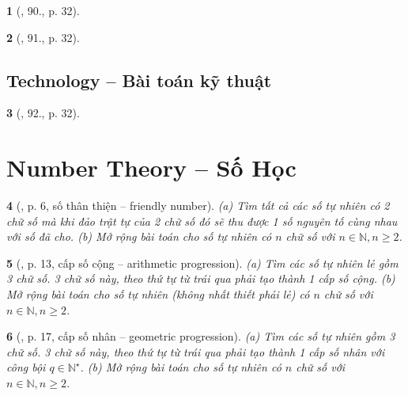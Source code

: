 \documentclass{article}
\newtheorem{baitoan}{}
\begin{document}
\begin{baitoan}[\cite{Doanh_Tuan_Pascal}, 90., p. 32]
	
\end{baitoan}

\begin{baitoan}[\cite{Doanh_Tuan_Pascal}, 91., p. 32]
	
\end{baitoan}


\subsection{Technology -- Bài toán kỹ thuật}

\begin{baitoan}[\cite{Doanh_Tuan_Pascal}, 92., p. 32]
	
\end{baitoan}


\section{Number Theory -- Số Học}

\begin{baitoan}[\cite{Huy_sang_tao_thuat_toan_lap_trinh_tap_1}, p. 6, số thân thiện -- friendly number]
	(a) Tìm tất cả các số tự nhiên có 2 chữ số mà khi đảo trật tự của 2 chữ số đó sẽ thu được 1 số nguyên tố cùng nhau với số đã cho. (b) Mở rộng bài toán cho số tự nhiên có $n$ chữ số với $n\in\mathbb{N},n\ge2$.
\end{baitoan}

\begin{baitoan}[\cite{Huy_sang_tao_thuat_toan_lap_trinh_tap_1}, p. 13, cấp số cộng -- arithmetic progression]
	(a) Tìm các số tự nhiên lẻ gồm 3 chữ số. 3 chữ số này, theo thứ tự từ trái qua phải tạo thành 1 cấp số cộng. (b) Mở rộng bài toán cho số tự nhiên (không nhất thiết phải lẻ) có $n$ chữ số với $n\in\mathbb{N},n\ge2$.
\end{baitoan}

\begin{baitoan}[\cite{Huy_sang_tao_thuat_toan_lap_trinh_tap_1}, p. 17, cấp số nhân -- geometric progression]
	(a) Tìm các số tự nhiên gồm 3 chữ số. 3 chữ số này, theo thứ tự từ trái qua phải tạo thành 1 cấp số nhân với công bội $q\in\mathbb{N}^\star$. (b) Mở rộng bài toán cho số tự nhiên có $n$ chữ số với $n\in\mathbb{N},n\ge2$.
\end{baitoan}
\end{document}
